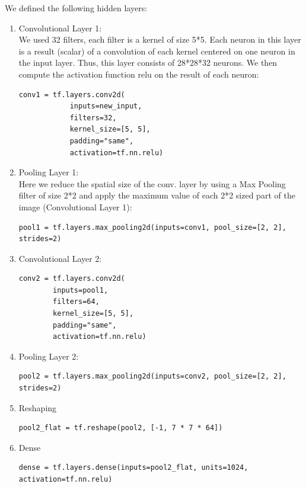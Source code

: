 \documentclass[12pt]{article}
\begin{document}
We defined the following hidden layers:
\begin{enumerate}

\item
Convolutional Layer 1:\\
We used 32 filters, each filter is a kernel of size 5*5. Each neuron in this layer is a result (scalar) of a convolution of each kernel centered on one neuron in the input layer. Thus, this layer consists of 28*28*32 neurons.
We then compute the activation function relu on the result of each neuron:
\begin{lstlisting}[style=PyStyle]
    conv1 = tf.layers.conv2d(
            inputs=new_input,
            filters=32,
            kernel_size=[5, 5],
            padding="same",
            activation=tf.nn.relu)
\end{lstlisting}

\item
Pooling Layer 1:\\
Here we reduce	 the spatial size of the conv. layer by using a Max Pooling filter of size 2*2 and apply the maximum value of each 2*2 sized part of the image (Convolutional Layer 1): 

\begin{lstlisting}[style=PyStyle]
pool1 = tf.layers.max_pooling2d(inputs=conv1, pool_size=[2, 2], strides=2)
\end{lstlisting}

\item
Convolutional Layer 2:\\
\begin{lstlisting}[style=PyStyle]
  conv2 = tf.layers.conv2d(
        inputs=pool1,
        filters=64,
        kernel_size=[5, 5],
        padding="same",
        activation=tf.nn.relu)
\end{lstlisting}

\item
Pooling Layer 2:\\
\begin{lstlisting}[style=PyStyle]
      pool2 = tf.layers.max_pooling2d(inputs=conv2, pool_size=[2, 2], strides=2)
\end{lstlisting}

\item
Reshaping
\begin{lstlisting}[style=PyStyle]
         pool2_flat = tf.reshape(pool2, [-1, 7 * 7 * 64])
\end{lstlisting}

\item
Dense
\begin{lstlisting}[style=PyStyle]
         dense = tf.layers.dense(inputs=pool2_flat, units=1024, activation=tf.nn.relu)    
\end{lstlisting}


\end{enumerate}
\end{document}
